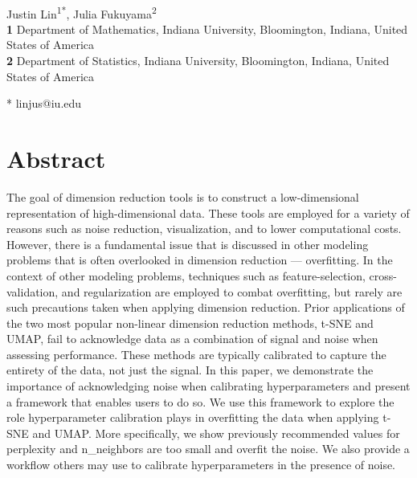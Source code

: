 \documentclass[10pt,letterpaper]{article}
\begin{document}
\vspace*{0.2in}

\begin{flushleft}
{\Large
\textbf{} %
}
\newline
\\
Justin Lin\textsuperscript{1*},
Julia Fukuyama\textsuperscript{2}
\\
\bigskip
\textbf{1} Department of Mathematics, Indiana University, Bloomington, Indiana, United States of America
\\
\textbf{2} Department of Statistics, Indiana University, Bloomington, Indiana, United States of America
\\
\bigskip

* linjus@iu.edu

\end{flushleft}
\section*{Abstract}
The goal of dimension reduction tools is to construct a low-dimensional representation of high-dimensional data. These tools are employed for a variety of reasons such as noise reduction, visualization, and to lower computational costs. However, there is a fundamental issue that is discussed in other modeling problems that is
often overlooked in dimension reduction --- overfitting. In the context of other modeling problems, techniques such as feature-selection, cross-validation, and regularization are employed to combat overfitting, but rarely are such precautions taken when applying dimension reduction. Prior applications of the two most popular non-linear dimension reduction methods, t-SNE and UMAP, fail to acknowledge data as a combination of signal and noise when assessing performance. These methods are typically calibrated to capture the entirety of the data, not just the signal. In this paper, we demonstrate the importance of acknowledging noise when calibrating hyperparameters and present a framework that enables users to do so. We use this framework to explore the role hyperparameter calibration plays in overfitting the data when applying t-SNE and UMAP. More specifically, we show previously recommended values for perplexity and n\_neighbors are too small and overfit the noise. We also provide a workflow others may use to calibrate hyperparameters in the presence of noise.
\end{document}

